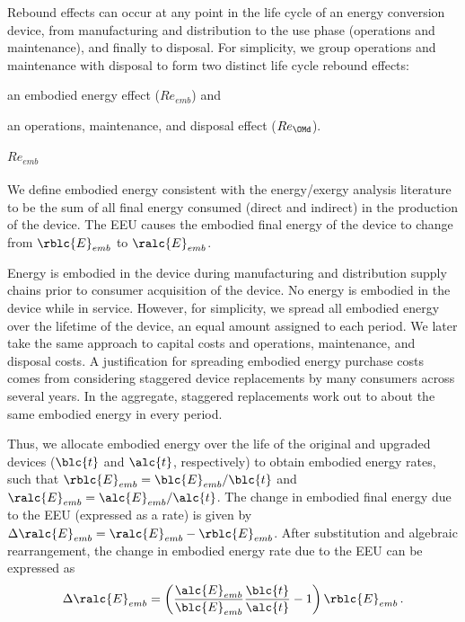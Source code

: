 Rebound effects can occur at any point in the life cycle of an energy conversion device,
from manufacturing and distribution 
to the use phase (operations and maintenance),
and finally to disposal.
For simplicity, we group operations and maintenance with disposal to form
two distinct life cycle rebound effects:
%
\begin{enumerate*}[label={(\alph*)}]
	
  \item an embodied energy effect ($Re_{emb}$) and 
  
  \item an operations, maintenance, and disposal effect ($Re_{\OMd}$).
    
\end{enumerate*}


\paragraph{$Re_{emb}$}
\label{sec:Re_emb}

We define embodied energy consistent with the energy/exergy analysis literature
to be the sum of all final energy consumed (direct and indirect)
in the production of the device.
The EEU
causes the embodied final energy of the device to change
from $\rblc{E}_{emb}$ to $\ralc{E}_{emb}$.

Energy is embodied in the device during manufacturing and distribution supply chains
prior to consumer acquisition of the device.
No energy is embodied in the device while in service.
However, for simplicity, we spread all embodied energy
over the lifetime of the device,
an equal amount assigned to each period.
We later take the same approach to capital costs and
operations, maintenance, and disposal costs.
A justification for spreading embodied energy purchase costs comes from considering
staggered device replacements by many consumers across several years.
In the aggregate, staggered replacements
work out to about the same embodied energy in every period.

Thus, we allocate embodied energy over the life of the original and upgraded devices
($\blc{t}$ and $\alc{t}$, respectively)
to obtain embodied energy rates, such that
$\rblc{E}_{emb} = \blc{E}_{emb} / \blc{t}$
and 
$\ralc{E}_{emb} = \alc{E}_{emb} / \alc{t}$.
The change in embodied final energy due to the EEU (expressed as a rate) is given by
$\Delta \ralc{E}_{emb} = \ralc{E}_{emb} - \rblc{E}_{emb}$.
After substitution and algebraic rearrangement,
the change in embodied energy rate due to the EEU can be expressed as
%
\begin{equation} \label{eq:delta_embodied}
  \Delta \ralc{E}_{emb} = \left( \frac{\alc{E}_{emb}}{\blc{E}_{emb}}
  \frac{\blc{t}}{\alc{t}} - 1 \right) \rblc{E}_{emb} \, .
\end{equation}

